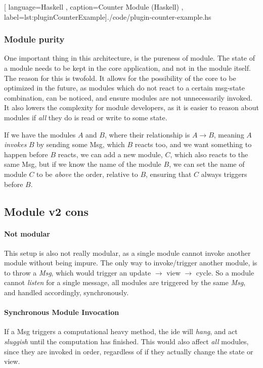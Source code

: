 \begin{center}
  
    [ language=Haskell
    , caption={Counter Module (Haskell)}
    , label=lst:pluginCounterExample]{./code/plugin-counter-example.hs}
\end{center}

\subsubsection{Module purity}

One important thing in this architecture, is the pureness of module. The state
of a module needs to be kept in the core application, and not in the module
itself. The reason for this is twofold. It allows for the possibility of the
core to be optimized in the future, as modules which do not react to a certain
msg-state combination, can be noticed, and ensure modules are not unnecessarily
invoked. It also lowers the complexity for module developers, as it is easier to
reason about modules if \textit{all} they do is read or write to some state.

If we have the modules $A$ and $B$, where their relationship is $A \to B$,
meaning $A$ \textit{invokes} $B$ by sending some Msg, which $B$ reacts too, and
we want something to happen before $B$ reacts, we can add a new module, $C$,
which also reacts to the same Msg, but if we know the name of the module $B$,
we can set the name of module $C$ to be \textit{above} the order, relative to
$B$, ensuring that $C$ always triggers before $B$.

\subsection{Module v2 cons}

\paragraph{Not modular} This setup is also not really modular, as a single
module cannot invoke another module without being impure. The only way to
invoke/trigger another module, is to throw a \textit{Msg}, which would trigger
an update $\to$ view $\to$ cycle. So a module cannot \textit{listen} for a single
message, all modules are triggered by the same \textit{Msg}, and handled
accordingly, synchronously.

\paragraph{Synchronous Module Invocation} If a Msg triggers a computational
heavy method, the \gls*{ide} will \textit{hang}, and act \textit{sluggish} until
the computation has finished. This would also affect \textit{all} modules,
since they are invoked in order, regardless of if they actually change the
state or view.

